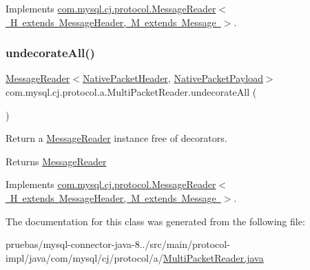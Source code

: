 Implements \mbox{\hyperlink{interfacecom_1_1mysql_1_1cj_1_1protocol_1_1_message_reader_a59b0e118857c167ad4a270845f19e89b}{com.\+mysql.\+cj.\+protocol.\+Message\+Reader$<$ H extends Message\+Header, M extends Message $>$}}.

\mbox{\label{classcom_1_1mysql_1_1cj_1_1protocol_1_1a_1_1_multi_packet_reader_a2a1c000ea384788f1ef5d8add224d309}} 
\subsubsection{\texorpdfstring{undecorate\+All()}{undecorateAll()}}
{\footnotesize\ttfamily \mbox{\hyperlink{interfacecom_1_1mysql_1_1cj_1_1protocol_1_1_message_reader}{Message\+Reader}}$<$\mbox{\hyperlink{classcom_1_1mysql_1_1cj_1_1protocol_1_1a_1_1_native_packet_header}{Native\+Packet\+Header}}, \mbox{\hyperlink{classcom_1_1mysql_1_1cj_1_1protocol_1_1a_1_1_native_packet_payload}{Native\+Packet\+Payload}}$>$ com.\+mysql.\+cj.\+protocol.\+a.\+Multi\+Packet\+Reader.\+undecorate\+All (\begin{DoxyParamCaption}{ }\end{DoxyParamCaption})}

Return a \mbox{\hyperlink{interfacecom_1_1mysql_1_1cj_1_1protocol_1_1_message_reader}{Message\+Reader}} instance free of decorators.

\begin{DoxyReturn}{Returns}
\mbox{\hyperlink{interfacecom_1_1mysql_1_1cj_1_1protocol_1_1_message_reader}{Message\+Reader}} 
\end{DoxyReturn}


Implements \mbox{\hyperlink{interfacecom_1_1mysql_1_1cj_1_1protocol_1_1_message_reader_a22a326215a91e4d7bff08d1f2c3e1b6d}{com.\+mysql.\+cj.\+protocol.\+Message\+Reader$<$ H extends Message\+Header, M extends Message $>$}}.



The documentation for this class was generated from the following file\+:\begin{DoxyCompactItemize}
\item 
pruebas/mysql-\/connector-\/java-\/8../src/main/protocol-\/impl/java/com/mysql/cj/protocol/a/\mbox{\hyperlink{_multi_packet_reader_8java}{Multi\+Packet\+Reader.\+java}}\end{DoxyCompactItemize}
